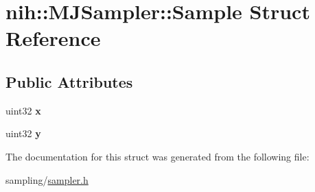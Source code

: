 \hypertarget{structnih_1_1_m_j_sampler_1_1_sample}{
\section{nih\-:\-:\-M\-J\-Sampler\-:\-:\-Sample \-Struct \-Reference}
\label{structnih_1_1_m_j_sampler_1_1_sample}
}
\subsection*{\-Public \-Attributes}
\begin{DoxyCompactItemize}
\item 
\hypertarget{structnih_1_1_m_j_sampler_1_1_sample_ad37783a6dc7fb42cfe969246ff24054e}{
uint32 {\bfseries x}}
\label{structnih_1_1_m_j_sampler_1_1_sample_ad37783a6dc7fb42cfe969246ff24054e}

\item 
\hypertarget{structnih_1_1_m_j_sampler_1_1_sample_a1689fb7c3efb85a2ac4832dad0a73007}{
uint32 {\bfseries y}}
\label{structnih_1_1_m_j_sampler_1_1_sample_a1689fb7c3efb85a2ac4832dad0a73007}

\end{DoxyCompactItemize}


\-The documentation for this struct was generated from the following file\-:\begin{DoxyCompactItemize}
\item 
sampling/\hyperlink{sampler_8h}{sampler.\-h}\end{DoxyCompactItemize}
